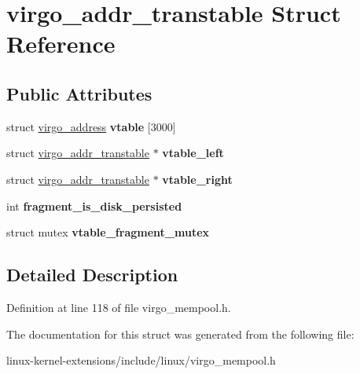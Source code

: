\hypertarget{structvirgo__addr__transtable}{\section{virgo\-\_\-addr\-\_\-transtable Struct Reference}
\label{structvirgo__addr__transtable}
}
\subsection*{Public Attributes}
\begin{DoxyCompactItemize}
\item 
\hypertarget{structvirgo__addr__transtable_a61220aa98e0d127662944a496050150a}{struct \hyperlink{structvirgo__address}{virgo\-\_\-address} {\bfseries vtable} \mbox{[}3000\mbox{]}}\label{structvirgo__addr__transtable_a61220aa98e0d127662944a496050150a}

\item 
\hypertarget{structvirgo__addr__transtable_a82a0483a9aa7f869e42dafec9566df89}{struct \hyperlink{structvirgo__addr__transtable}{virgo\-\_\-addr\-\_\-transtable} $\ast$ {\bfseries vtable\-\_\-left}}\label{structvirgo__addr__transtable_a82a0483a9aa7f869e42dafec9566df89}

\item 
\hypertarget{structvirgo__addr__transtable_a5e45f305b6c20a9d9549d4550df15839}{struct \hyperlink{structvirgo__addr__transtable}{virgo\-\_\-addr\-\_\-transtable} $\ast$ {\bfseries vtable\-\_\-right}}\label{structvirgo__addr__transtable_a5e45f305b6c20a9d9549d4550df15839}

\item 
\hypertarget{structvirgo__addr__transtable_a6cf4f81084038187748747859b11958e}{int {\bfseries fragment\-\_\-is\-\_\-disk\-\_\-persisted}}\label{structvirgo__addr__transtable_a6cf4f81084038187748747859b11958e}

\item 
\hypertarget{structvirgo__addr__transtable_a163773c0960232e3b50f40b1d10688ef}{struct mutex {\bfseries vtable\-\_\-fragment\-\_\-mutex}}\label{structvirgo__addr__transtable_a163773c0960232e3b50f40b1d10688ef}

\end{DoxyCompactItemize}


\subsection{Detailed Description}


Definition at line 118 of file virgo\-\_\-mempool.\-h.



The documentation for this struct was generated from the following file\-:\begin{DoxyCompactItemize}
\item 
linux-\/kernel-\/extensions/include/linux/virgo\-\_\-mempool.\-h\end{DoxyCompactItemize}
